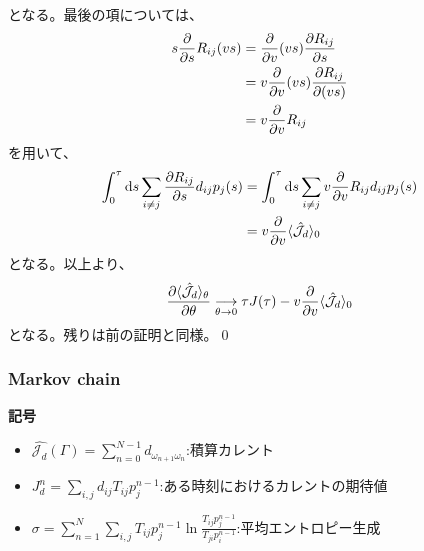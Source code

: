 \documentclass[a4paper,11pt]{jsarticle}
\numberwithin{equation}{section}
\begin{document}
となる。最後の項については、
\begin{align}
    s\pdv{s}R_{ij}(vs) &= \pdv{v}(vs)\pdv{R_{ij}}{s}\\
    &= v\pdv{v}(vs)\pdv{R_{ij}}{(vs)}\\
    &= v\pdv{v}R_{ij}
\end{align}
を用いて、
\begin{align}
    \int_{0}^{\tau} \dd{s} \sum_{i \neq j} \pdv{R_{ij}}{s}d_{ij}p_j(s) 
    &= \int_{0}^{\tau} \dd{s} \sum_{i \neq j} v\pdv{v}R_{ij}d_{ij}p_j(s)\\
    &= v\pdv{v}\langle \hat{\mathcal{J}_d} \rangle_0
\end{align}
となる。以上より、
\begin{align}
    \pdv{\langle \hat{\mathcal{J}_d} \rangle_\theta}{\theta} \underset{\theta \to 0}{\longrightarrow}  \tau J(\tau)- v\pdv{v}\langle \hat{\mathcal{J}_d} \rangle_0
\end{align}
となる。残りは前の証明と同様。\qed\\


\subsubsection{Markov chain}



\textbf{記号}
\begin{itemize}
    \item ${\hat{\mathcal{J}_d}}(\Gamma) = \sum_{n=0}^{N-1} d_{\omega_{n+1}\omega_n}$:積算カレント
    \item $J_d^n = \sum_{i,j} d_{ij} T_{ij} p_{j}^{n-1}$:ある時刻におけるカレントの期待値
    \item $\sigma = \sum_{n=1}^{N} \sum_{i,j} T_{ij} p_{j}^{n-1} \ln \frac{T_{ij} p_{j}^{n-1}}{T_{ji} p_{i}^{n-1}}$:平均エントロピー生成
\end{itemize}
\end{document}
